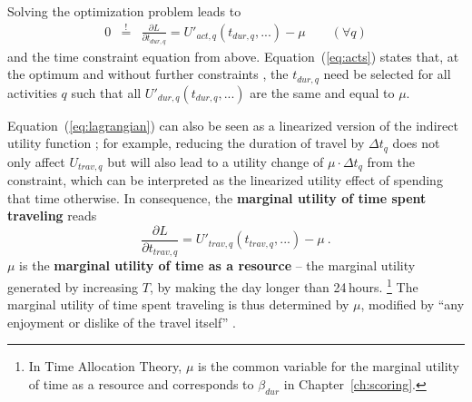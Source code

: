 Solving the optimization problem leads to
\begin{eqnarray}
0 & \stackrel!= & \frac{\partial L}{\partial t_{dur,q}} = U'_{act,q}(t_{dur,q},...) - \mu 
%
\qquad (\forall q)
\label{eq:acts}
\end{eqnarray}
and the time constraint equation from above.
%
Equation~(\ref{eq:acts}) states that, at the optimum and without further constraints%
%
%
, the $t_{dur,q}$ need be selected for all activities $q$ such that all $U'_{dur,q}(t_{dur,q},...)$ are the same and equal to $\mu$.

Equation~(\ref{eq:lagrangian}) can also be seen as a linearized version of the indirect utility function%
%
%
%
; for example, reducing the duration of travel by $\Delta t_q$ does not only affect $U_{trav,q}$ but will also lead to a utility change of $ \mu \cdot \Delta t_q$ from the constraint, which can be interpreted as the linearized utility effect of spending that time otherwise.
%
In consequence, the \textbf{marginal utility of time spent traveling} reads
%
\begin{equation}
\frac{\partial L}{\partial t_{trav,q}} = U'_{trav,q}(t_{trav,q},...) - \mu \ .
\label{eq:marg-UoT}
\end{equation}
%
$\mu$ is the \textbf{marginal utility of time as a resource} -- the marginal utility generated by increasing $T$, \ie by making the day longer than 24\,hours.%
%
\footnote{
%
In Time Allocation Theory, $\mu$ is the common variable for the marginal utility of time as a resource and corresponds to $\beta_{dur}$ in Chapter~\ref{ch:scoring}.
%
}
%
The marginal utility of time spent traveling is thus determined by $\mu$, modified by ``any enjoyment or dislike of the travel itself'' \citep{Small2012ValuationOfTimeRevisited}.

